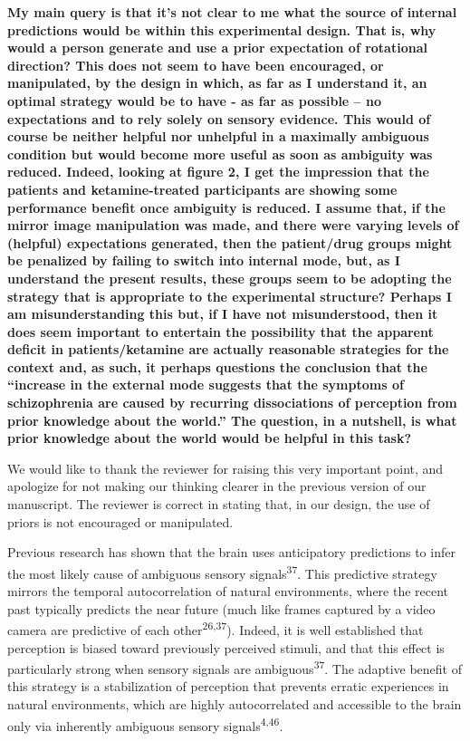 \documentclass[
]{article}
\begin{document}
\textbf{My main query is that it's not clear to me what the source of
internal predictions would be within this experimental design. That is,
why would a person generate and use a prior expectation of rotational
direction? This does not seem to have been encouraged, or manipulated,
by the design in which, as far as I understand it, an optimal strategy
would be to have - as far as possible -- no expectations and to rely
solely on sensory evidence. This would of course be neither helpful nor
unhelpful in a maximally ambiguous condition but would become more
useful as soon as ambiguity was reduced. Indeed, looking at figure 2, I
get the impression that the patients and ketamine-treated participants
are showing some performance benefit once ambiguity is reduced. I assume
that, if the mirror image manipulation was made, and there were varying
levels of (helpful) expectations generated, then the patient/drug groups
might be penalized by failing to switch into internal mode, but, as I
understand the present results, these groups seem to be adopting the
strategy that is appropriate to the experimental structure? Perhaps I am
misunderstanding this but, if I have not misunderstood, then it does
seem important to entertain the possibility that the apparent deficit in
patients/ketamine are actually reasonable strategies for the context
and, as such, it perhaps questions the conclusion that the ``increase in
the external mode suggests that the symptoms of schizophrenia are caused
by recurring dissociations of perception from prior knowledge about the
world.'' The question, in a nutshell, is what prior knowledge about the
world would be helpful in this task?}

We would like to thank the reviewer for raising this very important
point, and apologize for not making our thinking clearer in the previous
version of our manuscript. The reviewer is correct in stating that, in
our design, the use of priors is not encouraged or manipulated.

Previous research has shown that the brain uses anticipatory predictions
to infer the most likely cause of ambiguous sensory
signals\textsuperscript{37}. This predictive strategy mirrors the
temporal autocorrelation of natural environments, where the recent past
typically predicts the near future (much like frames captured by a video
camera are predictive of each other\textsuperscript{26,37}). Indeed, it
is well established that perception is biased toward previously
perceived stimuli, and that this effect is particularly strong when
sensory signals are ambiguous\textsuperscript{37}. The adaptive benefit
of this strategy is a stabilization of perception that prevents erratic
experiences in natural environments, which are highly autocorrelated and
accessible to the brain only via inherently ambiguous sensory
signals\textsuperscript{4,46}.
\end{document}
